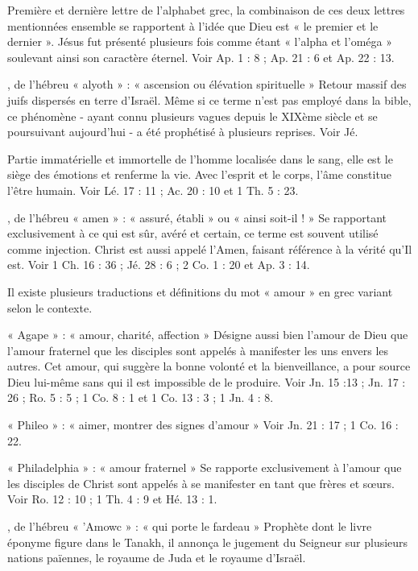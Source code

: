 \begin{multicols}{2}
Première et dernière lettre de l'alphabet grec, la combinaison de ces deux lettres mentionnées ensemble se rapportent à l’idée que Dieu est « le premier et le dernier ». Jésus fut présenté plusieurs fois comme étant « l’alpha et l’oméga » soulevant ainsi son caractère éternel. Voir Ap. 1 : 8 ; Ap. 21 : 6 et Ap. 22 : 13.

, de l’hébreu « alyoth » : « ascension ou élévation spirituelle »
Retour massif des juifs dispersés en terre d'Israël. Même si ce terme n’est pas employé dans la bible, ce phénomène - ayant connu plusieurs vagues depuis le XIXème siècle et se poursuivant aujourd’hui - a été prophétisé à plusieurs reprises. Voir Jé.

Partie immatérielle et immortelle de l'homme localisée dans le sang, elle est le siège des émotions et renferme la vie. Avec l'esprit et le corps, l'âme constitue l'être humain. Voir Lé. 17 : 11 ; Ac. 20 : 10 et 1 Th. 5 : 23.

, de l’hébreu « amen » : « assuré, établi » ou « ainsi soit-il ! »
Se rapportant exclusivement à ce qui est sûr, avéré et certain, ce terme est souvent utilisé comme injection. Christ est aussi appelé l'Amen, faisant référence à la vérité qu’Il est. Voir 1 Ch. 16 : 36 ; Jé. 28 : 6 ; 2 Co. 1 : 20 et Ap. 3 : 14.

Il existe plusieurs traductions et définitions du mot « amour » en grec variant selon le contexte.

« Agape » : « amour, charité, affection »
Désigne aussi bien l’amour de Dieu que l’amour fraternel que les disciples sont appelés à manifester les uns envers les autres. Cet amour, qui suggère la bonne volonté et la bienveillance, a pour source Dieu lui-même sans qui il est impossible de le produire. Voir Jn. 15 :13 ; Jn. 17 : 26 ; Ro. 5 : 5 ; 1 Co. 8 : 1 et 1 Co. 13 : 3 ; 1 Jn. 4 : 8.

« Phileo » : « aimer, montrer des signes d’amour »
Voir Jn. 21 : 17 ; 1 Co. 16 : 22.

« Philadelphia » : « amour fraternel »
Se rapporte exclusivement à l’amour que les disciples de Christ sont appelés à se manifester en tant que frères et sœurs. Voir Ro. 12 : 10 ; 1 Th. 4 : 9 et Hé. 13 : 1.

, de l'hébreu « 'Amowc » : « qui porte le fardeau »
Prophète dont le livre éponyme figure dans le Tanakh, il annonça le jugement du Seigneur sur plusieurs nations païennes, le royaume de Juda et le royaume d'Israël.


\end{multicols}
